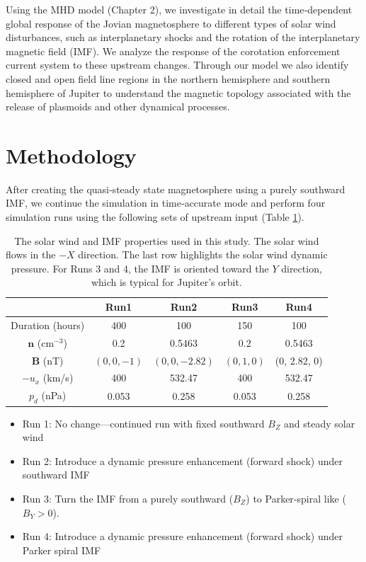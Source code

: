 Using the MHD model (Chapter 2), we investigate in detail the time‐dependent global response of the Jovian magnetosphere to different types of solar wind disturbances, such as interplanetary shocks and the rotation of the interplanetary magnetic field (IMF). We analyze the response of the corotation enforcement current system to these upstream changes. Through our model we also identify closed and open field line regions in the northern hemisphere and southern hemisphere of Jupiter to understand the magnetic topology associated with the release of plasmoids and other dynamical processes. 



\section{Methodology}

After creating the quasi‐steady state magnetosphere using a purely southward IMF, we continue the simulation in time‐accurate mode and perform four simulation runs using the following sets of upstream input (Table \ref{tab:sw-conditions}). 

\begin{table}
    \centering
    \begin{tabular}{c|c|c|c|c}
         &Run1  &Run2   &Run3   &Run4  \\
    \hline
    Duration (hours) &400   &100    &150    &100\\
    $\mathbf{n}$ (cm$^{-3}$)    &0.2    &0.5463  &0.2   &0.5463\\
    $\mathbf{B}$ (nT)           &$(0,0,-1)$ &$(0,0,-2.82)$ &$(0, 1, 0)$ &(0, 2.82, 0)\\
    $-u_x$ (km/s)               &400    &532.47     &400    &532.47\\
    $p_d$ (nPa)                 &0.053  &0.258  &0.053  &0.258
    \end{tabular}
    \caption{The solar wind and IMF properties used in this study. The solar wind flows in the $-X$ direction. The last row highlights the solar wind dynamic pressure. For Runs 3 and 4, the IMF is oriented toward the $Y$ direction, which is typical for Jupiter's orbit.}
    \label{tab:sw-conditions}
\end{table}

\begin{itemize}
    \item Run 1: No change—continued run with fixed southward $B_Z$ and steady solar wind
    \item Run 2: Introduce a dynamic pressure enhancement (forward shock) under southward IMF
    \item Run 3: Turn the IMF from a purely southward ($B_Z$) to Parker‐spiral like ($B_Y > 0$).
    \item Run 4: Introduce a dynamic pressure enhancement (forward shock) under Parker spiral IMF
\end{itemize}

